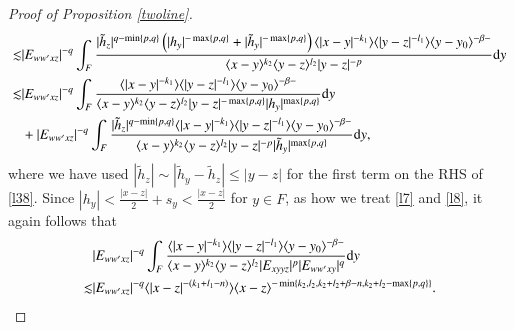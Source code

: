 \documentclass[11pt,reqno]{amsart}
\def\d{{\rm d}}
\numberwithin{equation}{section}
\theoremstyle{definition}
\begin{document}
\begin{appendix}
\begin{proof}[Proof of Proposition \ref{twoline}]
\begin{equation}
\begin{split}
				\lesssim&|E_{ww'xz}|^{-q}\int_F\frac{|\tilde{h}_z|^{q-\min\{p,q\}}\left(|h_y|^{-\max\{p,q\}}+|\tilde{h}_y|^{-\max\{p,q\}}\right)\langle|x-y|^{-k_1}\rangle\langle|y-z|^{-l_1}\rangle\langle y-y_0\rangle^{-\beta-}}{\langle x-y\rangle^{k_2}\langle y-z\rangle^{l_2}|y-z|^{-p}}\d y\\
				\lesssim&|E_{ww'xz}|^{-q}\int_F\frac{\langle|x-y|^{-k_1}\rangle\langle|y-z|^{-l_1}\rangle\langle y-y_0\rangle^{-\beta-}}{\langle x-y\rangle^{k_2}\langle y-z\rangle^{l_2}|y-z|^{-\max\{p,q\}}|h_y|^{\max\{p,q\}}}\d y\\
				&+|E_{ww'xz}|^{-q}\int_F\frac{|\tilde{h}_z|^{q-\min\{p,q\}}\langle|x-y|^{-k_1}\rangle\langle|y-z|^{-l_1}\rangle\langle y-y_0\rangle^{-\beta-}}{\langle x-y\rangle^{k_2}\langle y-z\rangle^{l_2}|y-z|^{-p}|\tilde{h}_y|^{\max\{p,q\}}}\d y,
			\end{split}
		\end{equation}
		where we have used $|\tilde{h}_z|\sim|\tilde{h}_y-\tilde{h}_z|\leq|y-z|$ for the first term on the RHS of \eqref{l38}. Since $|h_y|<\frac{|x-z|}{2}+s_y<\frac{|x-z|}{2}$ for $y\in F$, as how we treat \eqref{l7} and \eqref{l8}, it again follows that
		\begin{equation*}\label{l39}
			\begin{split}
				&|E_{ww'xz}|^{-q}\int_F\frac{\langle|x-y|^{-k_1}\rangle\langle|y-z|^{-l_1}\rangle\langle y-y_0\rangle^{-\beta-}}{\langle x-y\rangle^{k_2}\langle y-z\rangle^{l_2}|E_{xyyz}|^p|E_{ww'xy}|^q}\d y\\
				\lesssim&|E_{ww'xz}|^{-q}\langle|x-z|^{-(k_1+l_1-n)}\rangle\langle x-z\rangle^{-\min\{k_2,l_2,k_2+l_2+\beta-n,k_2+l_2-\max\{p,q\}\}}.
			\end{split}
		\end{equation*}
		

\end{proof}
\end{appendix}
\end{document}
